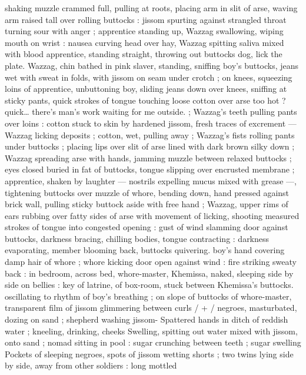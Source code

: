 shaking muzzle crammed full, pulling at roots, placing arm in slit of 
arse, waving arm raised tall over rolling buttocks : jissom spurting 
against strangled throat turning sour with anger ; apprentice 
standing up, Wazzag swallowing, wiping mouth on wrist : nausea 
curving head over hay, Wazzag spitting saliva mixed with blood 
apprentice, standing straight, throwing out buttocks{\td} {\gl} dog, lick the 
plate.{\gr} Wazzag, chin bathed in pink slaver, standing, sniffing boy's 
buttocks, jeans wet with sweat in folds, with jissom on seam under 
crotch ; on knees, squeezing loins of apprentice, unbuttoning boy, 
sliding jeans down over knees, sniffing at sticky pants, quick strokes 
of tongue touching loose cotton over arse{\td} {\gl} too hot ?{\td} quick{\ldots} 
there's man's work waiting for me outside. {\gr} ; Wazzag's teeth pulling 
pants over loins : cotton stuck to skin by hardened jissom, fresh 
traces of excrement --- Wazzag licking deposits ; cotton, wet, pulling 
away ; Wazzag's fists rolling pants under buttocks ; placing lips over 
slit of arse lined with dark brown silky down ; Wazzag spreading arse 
with hands, jamming muzzle between relaxed buttocks ; eyes closed 
buried in fat of buttocks, tongue slipping over encrusted membrane 
; apprentice, shaken by laughter --- nostrils expelling mucus mixed 
with grease ---, tightening buttocks over muzzle of whore, bending 
down, hand pressed against brick wall, pulling sticky buttock aside 
with free hand ; Wazzag, upper rims of ears rubbing over fatty sides 
of arse with movement of licking, shooting measured strokes of 
tongue into congested opening : gust of wind slamming door against 
buttocks, darkness bracing, chilling bodies, tongue contracting : 
darkness evaporating, member blooming back, buttocks quivering. 
boy's hand covering damp hair of whore ; whore kicking door open 
against wind : fire striking sweaty back : in bedroom, across bed, 
whore-master, Khemissa, naked, sleeping side by side on bellies : 
key of latrine, of box-room, stuck between Khemissa's buttocks. 
oscillating to rhythm of boy's breathing ; on slope of buttocks of 
whore-master, transparent film of jissom glimmering between curls {\slash} 
+ {\slash} negroes, masturbated, dozing on sand ; shepherd washing jissom- 
Spattered hands in ditch of reddish water ; kneeling, drinking, cheeks 
Swelling, spitting out water mixed with jissom, onto sand ; nomad 
sitting in pool : sugar crunching between teeth ; sugar swelling 
Pockets of sleeping negroes, spots of jissom wetting shorts ; two 
twins lying side by side, away from other soldiers : long mottled 
